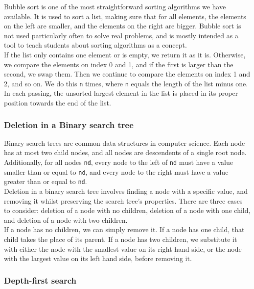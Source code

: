 Bubble sort is one of the most straightforward sorting algorithms we have available. It is used to sort a list, making sure that for all elements, the elements on the left are smaller, and the elements on the right are bigger. Bubble sort is not used particularly often to solve real problems, and is mostly intended as a tool to teach students about sorting algorithms as a concept. \\

If the list only contains one element or is empty, we return it as it is. Otherwise, we compare the elements on index 0 and 1, and if the first is larger than the second, we swap them. Then we continue to compare the elements on index 1 and 2, and so on. We do this \texttt{n} times, where \texttt{n} equals the length of the list minus one. In each passing, the unsorted largest element in the list is placed in its proper position towards the end of the list.

\subsubsection{Deletion in a Binary search tree}

Binary search trees are common data structures in computer science. Each node has at most two child nodes, and all nodes are descendents of a single root node. Additionally, for all nodes \texttt{nd}, every node to the left of \texttt{nd} must have a value smaller than or equal to \texttt{nd}, and every node to the right must have a value greater than or equal to \texttt{nd}. \\

Deletion in a binary search tree involves finding a node with a specific value, and removing it whilst preserving the search tree's properties. There are three cases to consider: deletion of a node with no children, deletion of a node with one child, and deletion of a node with two children. \\

If a node has no children, we can simply remove it. If a node has one child, that child takes the place of its parent. If a node has two children, we substitute it with either the node with the smallest value on its right hand side, or the node with the largest value on its left hand side, before removing it.

\subsubsection{Depth-first search}

